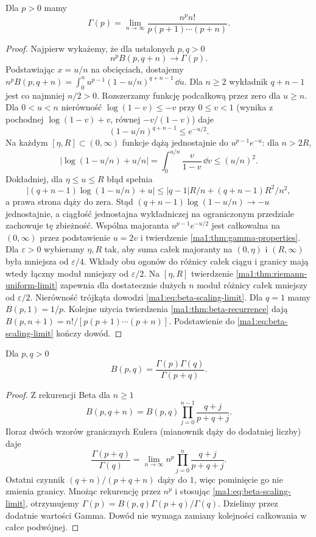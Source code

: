 \begin{twierdzenie}
\label{ma1:thm:gamma-euler-limit}
Dla $p>0$ mamy
\[
 \Gamma(p)=\lim_{n\to\infty}
 \frac{n^p n!}{p(p+1)\cdots(p+n)}.
\]
\end{twierdzenie}
\begin{proof}
Najpierw wykażemy, że dla ustalonych $p,q>0$
\begin{equation}
 \label{ma1:eq:beta-scaling-limit}
 n^p B(p,q+n)\longrightarrow\Gamma(p).
\end{equation}
Podstawiając $x=u/n$ na obcięciach, dostajemy
$n^p B(p,q+n)=\int_0^n u^{p-1}(1-u/n)^{q+n-1}\,\dd u$.
Dla $n\ge2$ wykładnik $q+n-1$ jest co najmniej $n/2>0$. Rozszerzamy funkcję podcałkową przez zero dla $u\ge n$. Dla $0<u<n$ nierówność $\log(1-v)\le-v$ przy $0\le v<1$ (wynika z pochodnej $\log(1-v)+v$, równej $-v/(1-v)$) daje
\[
 (1-u/n)^{q+n-1}\le e^{-u/2}.
\]
Na każdym $[\eta,R]\subset(0,\infty)$ funkcje dążą jednostajnie do $u^{p-1}e^{-u}$: dla $n>2R$,
\[
 |\log(1-u/n)+u/n|
 =\int_0^{u/n}\frac{v}{1-v}\,\dd v\le (u/n)^2.
\]
Dokładniej, dla $\eta\le u\le R$ błąd spełnia
\[
 |(q+n-1)\log(1-u/n)+u|
 \le |q-1|R/n+(q+n-1)R^2/n^2,
\]
a prawa strona dąży do zera. Stąd $(q+n-1)\log(1-u/n)\to-u$ jednostajnie, a ciągłość jednostajna wykładniczej na ograniczonym przedziale zachowuje tę zbieżność. Wspólna majoranta $u^{p-1}e^{-u/2}$ jest całkowalna na $(0,\infty)$ przez podstawienie $u=2v$ i twierdzenie \ref{ma1:thm:gamma-properties}. Dla $\varepsilon>0$ wybieramy $\eta,R$ tak, aby suma całek majoranty na $(0,\eta)$ i $(R,\infty)$ była mniejsza od $\varepsilon/4$. Wkłady obu ogonów do różnicy całek ciągu i granicy mają wtedy łączny moduł mniejszy od $\varepsilon/2$. Na $[\eta,R]$ twierdzenie \ref{ma1:thm:riemann-uniform-limit} zapewnia dla dostatecznie dużych $n$ moduł różnicy całek mniejszy od $\varepsilon/2$. Nierówność trójkąta dowodzi \eqref{ma1:eq:beta-scaling-limit}.
Dla $q=1$ mamy $B(p,1)=1/p$. Kolejne użycia twierdzenia \ref{ma1:thm:beta-recurrence} dają
$B(p,n+1)=n!/[p(p+1)\cdots(p+n)]$. Podstawienie do \eqref{ma1:eq:beta-scaling-limit} kończy dowód.
\end{proof}
\begin{twierdzenie}
\label{ma1:thm:beta-gamma}
Dla $p,q>0$
\[
 B(p,q)=\frac{\Gamma(p)\Gamma(q)}{\Gamma(p+q)}.
\]
\end{twierdzenie}
\begin{proof}
Z rekurencji Beta dla $n\ge1$
\[
 B(p,q+n)=B(p,q)\prod_{j=0}^{n-1}\frac{q+j}{p+q+j}.
\]
Iloraz dwóch wzorów granicznych Eulera (mianownik dąży do dodatniej liczby) daje
\[
 \frac{\Gamma(p+q)}{\Gamma(q)}
 =\lim_{n\to\infty}n^p\prod_{j=0}^n\frac{q+j}{p+q+j}.
\]
Ostatni czynnik $(q+n)/(p+q+n)$ dąży do $1$, więc pominięcie go nie zmienia granicy. Mnożąc rekurencję przez $n^p$ i stosując \eqref{ma1:eq:beta-scaling-limit}, otrzymujemy
$\Gamma(p)=B(p,q)\Gamma(p+q)/\Gamma(q)$. Dzielimy przez dodatnie wartości Gamma. Dowód nie wymaga zamiany kolejności całkowania w całce podwójnej.
\end{proof}

